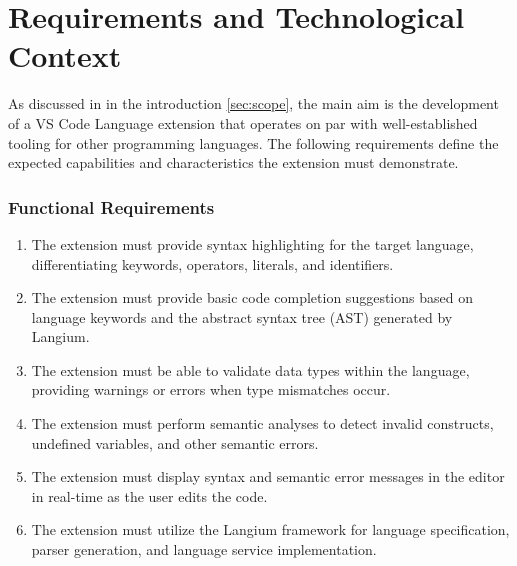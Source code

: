 \chapter{Requirements and Technological Context}

As discussed in in the introduction \ref{sec:scope}, the main aim is the development of a VS Code Language extension that operates on par with
well-established tooling for other programming languages. The following requirements define the expected capabilities and characteristics the extension must demonstrate.

\begin{multicols}{2}
  \subsection*{Functional Requirements}
  \begin{enumerate}
    \item The extension must provide syntax highlighting for the target language, differentiating keywords, operators, literals, and identifiers.
    \item The extension must provide basic code completion suggestions based on language keywords and the abstract syntax tree (AST) generated by Langium.
    \item The extension must be able to validate data types within the language, providing warnings or errors when type mismatches occur.
    \item The extension must perform semantic analyses to detect invalid constructs, undefined variables, and other semantic errors.
    \item The extension must display syntax and semantic error messages in the editor in real-time as the user edits the code.
    \item The extension must utilize the Langium framework for language specification, parser generation, and language service implementation.
  \end{enumerate}

  \columnbreak


\end{multicols}
